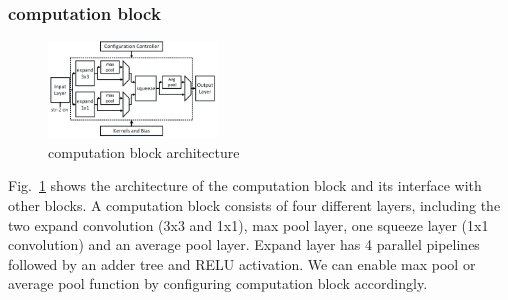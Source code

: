 \documentclass[conference]{IEEEtran}
\begin{document}
\subsubsection{computation block}

\begin{figure}[htbp]
\centerline{\includegraphics[width=0.4\textwidth]{computation.jpg}}
\caption{computation block architecture}
\label{cmp}
\end{figure}


Fig.~\ref{cmp} shows the architecture of the computation block and its interface with other blocks. A computation block consists of four different layers, including the two expand convolution (3x3 and 1x1), max pool layer, one squeeze layer (1x1 convolution) and an average pool layer. Expand layer has 4 parallel pipelines followed by an adder tree and RELU activation. We can enable max pool or average pool function by configuring computation block accordingly.






\end{document}
